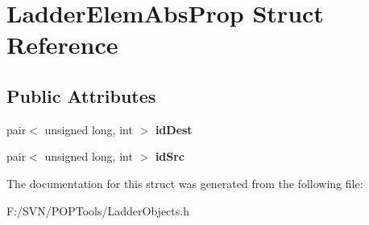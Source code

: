 \hypertarget{struct_ladder_elem_abs_prop}{\section{Ladder\-Elem\-Abs\-Prop Struct Reference}
\label{struct_ladder_elem_abs_prop}
}
\subsection*{Public Attributes}
\begin{DoxyCompactItemize}
\item 
\hypertarget{struct_ladder_elem_abs_prop_a38ba59d87c659e1ce0a1dc7b67fbe8a2}{pair$<$ unsigned long, int $>$ {\bfseries id\-Dest}}\label{struct_ladder_elem_abs_prop_a38ba59d87c659e1ce0a1dc7b67fbe8a2}

\item 
\hypertarget{struct_ladder_elem_abs_prop_a1df5c251b61ae7cd420a34b02a5dbf12}{pair$<$ unsigned long, int $>$ {\bfseries id\-Src}}\label{struct_ladder_elem_abs_prop_a1df5c251b61ae7cd420a34b02a5dbf12}

\end{DoxyCompactItemize}


The documentation for this struct was generated from the following file\-:\begin{DoxyCompactItemize}
\item 
F\-:/\-S\-V\-N/\-P\-O\-P\-Tools/Ladder\-Objects.\-h\end{DoxyCompactItemize}
